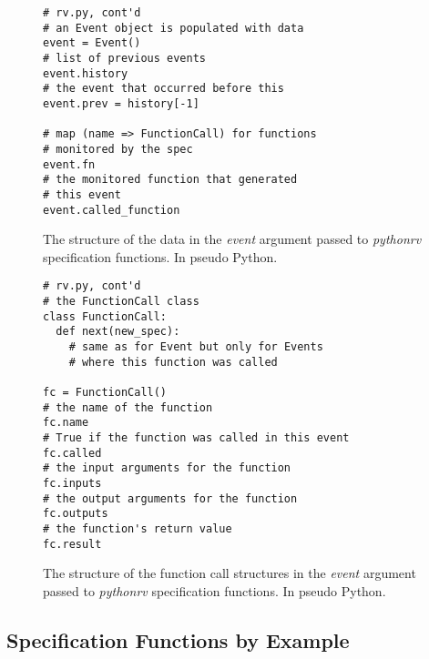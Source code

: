 \begin{figure}[h!]
	\begin{center}
	\begin{minipage}{0.7\textwidth}
	\begin{lstlisting}
# rv.py, cont'd
# an Event object is populated with data
event = Event()
# list of previous events
event.history
# the event that occurred before this
event.prev = history[-1]

# map (name => FunctionCall) for functions
# monitored by the spec
event.fn
# the monitored function that generated
# this event
event.called_function
	\end{lstlisting}
	\end{minipage}
	\end{center}

  \caption{The structure of the data in the \textit{event} argument passed to
    \textit{pythonrv} specification functions. In pseudo Python.}
	\label{figure-event-data}
\end{figure}

\begin{figure}[h!]
	\begin{center}
	\begin{minipage}{0.7\textwidth}
	\begin{lstlisting}
# rv.py, cont'd
# the FunctionCall class
class FunctionCall:
  def next(new_spec):
    # same as for Event but only for Events
    # where this function was called

fc = FunctionCall()
# the name of the function
fc.name
# True if the function was called in this event
fc.called
# the input arguments for the function
fc.inputs
# the output arguments for the function
fc.outputs
# the function's return value
fc.result
	\end{lstlisting}
	\end{minipage}
	\end{center}

  \caption{The structure of the function call structures in the \textit{event}
    argument passed to \textit{pythonrv} specification functions. In pseudo Python.}
	\label{figure-event-function-call}
\end{figure}



\clearpage
\subsection{Specification Functions by Example}
\lstset{language=Python,numbers=left}

